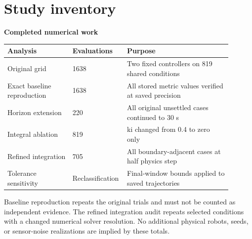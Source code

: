 \documentclass[11pt,a4paper]{article}
\begin{document}
\section*{Study inventory}
\textbf{Completed numerical work}
\begin{longtable}{p{0.288\linewidth}p{0.162\linewidth}p{0.45\linewidth}}
\toprule
Analysis & Evaluations & Purpose \\ \midrule \endhead
Original grid & 1638 & Two fixed controllers on 819 shared conditions \\
Exact baseline reproduction & 1638 & All stored metric values verified at saved precision \\
Horizon extension & 220 & All original unsettled cases continued to 30 s \\
Integral ablation & 819 & ki changed from 0.4 to zero only \\
Refined integration & 705 & All boundary-adjacent cases at half physics step \\
Tolerance sensitivity & Reclassification & Final-window bounds applied to saved trajectories \\
\bottomrule
\end{longtable}
Baseline reproduction repeats the original trials and must not be counted as independent evidence. The refined integration audit repeats selected conditions with a changed numerical solver resolution. No additional physical robots, seeds, or sensor-noise realizations are implied by these totals.
\end{document}
